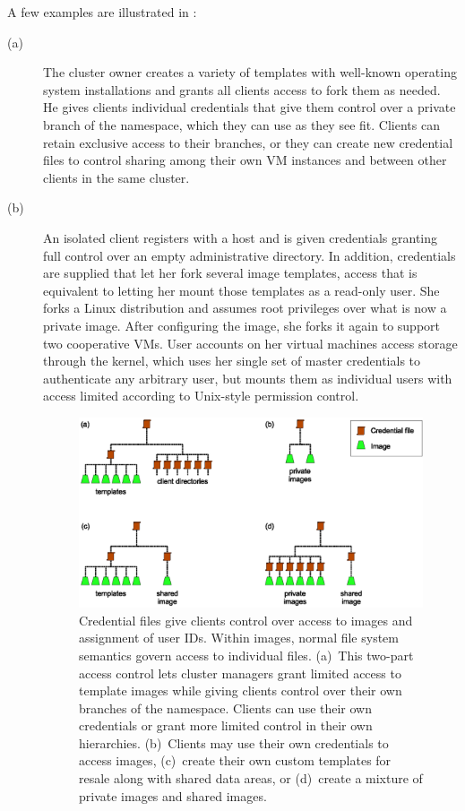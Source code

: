 A few examples are illustrated in :

\begin{description}

\item[(a)] The cluster owner creates a variety of templates with well-known operating system installations and grants all clients access to fork them as needed. He gives clients individual credentials that give them control over a private branch of the namespace, which they can use as they see fit. Clients can retain exclusive access to their branches, or they can create new credential files to control sharing among their own VM instances and between other clients in the same cluster.

\item[(b)] An isolated client registers with a host and is given credentials granting full control over an empty administrative directory. In addition, credentials are supplied that let her fork several image templates, access that is equivalent to letting her mount those templates as a read-only user. She forks a Linux distribution and assumes root privileges over what is now a private image. After configuring the image, she forks it again to support two cooperative VMs. User accounts on her virtual machines access storage through the kernel, which uses her single set of master credentials to authenticate any arbitrary user, but mounts them as individual users with access limited according to Unix-style permission control.

\begin{figure}[tp]
\centering
\includegraphics[width=\figwidth]{figures/image-credentials}
\caption[File system images and credential files]{Credential files give clients control over access to images and assignment of user IDs. Within images, normal file system semantics govern access to individual files. (a)~This two-part access control lets cluster managers grant limited access to template images while giving clients control over their own branches of the namespace. Clients can use their own credentials or grant more limited control in their own hierarchies. (b)~Clients may use their own credentials to access images, (c)~create their own custom templates for resale along with shared data areas, or (d)~create a mixture of private images and shared images.}
\label{fig:image-credentials}
\end{figure}


\end{description}
